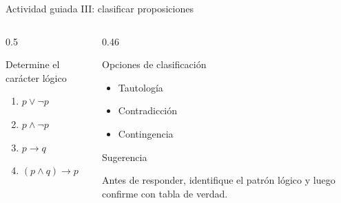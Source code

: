 \documentclass[aspectratio=169,10pt,handout]{beamer}
\newenvironment{IdeaClave}[1]
{
	\begin{block}{#1}
		\justifying
	}
	{
	\end{block}
}
\newenvironment{Alerta}[1]
{
	\begin{alertblock}{#1}
		\justifying
	}
	{
	\end{alertblock}
}
\newenvironment{Ejemplo}[1]
{
	\begin{exampleblock}{#1}
		\justifying
	}
	{
	\end{exampleblock}
}
\begin{document}
	\begin{frame}{Actividad guiada III: clasificar proposiciones}
		\begin{columns}[T,totalwidth=\textwidth]
			\begin{column}{0.5\textwidth}
				\begin{Ejemplo}{Determine el carácter lógico}
					\begin{enumerate}[leftmargin=*,label=\textbf{\arabic*.}]
						\item $p \lor \neg p$
						\item $p \land \neg p$
						\item $p \to q$
						\item $(p \land q) \to p$
					\end{enumerate}
				\end{Ejemplo}
			\end{column}
			\begin{column}{0.46\textwidth}
				\begin{IdeaClave}{Opciones de clasificación}
					\begin{itemize}[leftmargin=*]
						\item Tautología
						\item Contradicción
						\item Contingencia
					\end{itemize}
				\end{IdeaClave}
				
				\pause
				
				\begin{Alerta}{Sugerencia}
					Antes de responder, identifique el patrón lógico y luego confirme con tabla de verdad.
				\end{Alerta}
			\end{column}
		\end{columns}
	\end{frame}
	
\end{document}

